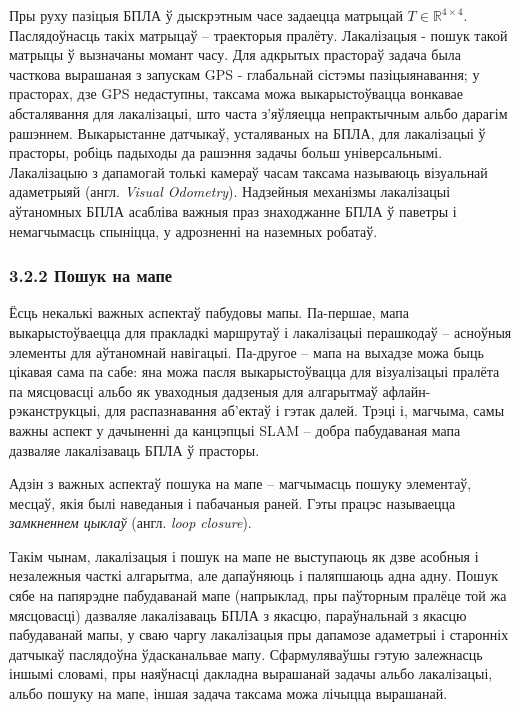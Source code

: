 Пры руху пазіцыя БПЛА ў дыскрэтным часе задаецца матрыцай $T \in \mathbb{R}^{4\times4}$.
Паслядоўнасць такіх матрыцаў -- траекторыя пралёту. Лакалізацыя - пошук такой матрыцы ў вызначаны момант часу.
Для адкрытых прастораў задача была часткова вырашаная з запускам GPS - глабальнай сістэмы
пазіцыянавання; у прасторах, дзе GPS недаступны, таксама можа выкарыстоўвацца вонкавае
абсталявання для лакалізацыі, што часта з'яўляецца непрактычным альбо дарагім рашэннем.
Выкарыстанне датчыкаў, усталяваных на БПЛА, для лакалізацыі ў прасторы, робіць падыходы
да рашэння задачы больш універсальнымі. Лакалізацыю з дапамогай толькі камераў часам
таксама называюць візуальнай адаметрыяй (англ. \textit{Visual Odometry}). Надзейныя механізмы
лакалізацыі аўтаномных БПЛА асабліва важныя праз знаходжанне БПЛА ў паветры і
немагчымасць спыніцца, у адрозненні на наземных робатаў.

\renewcommand{\nextTitle}{3.2.2 Пошук на мапе}
\addcontentsline{toc}{subsubsection}{\nextTitle}
\subsubsection*{\nextTitle}

Ёсць некалькі важных аспектаў пабудовы мапы. Па-першае, мапа выкарыстоўваецца для пракладкі
маршрутаў і лакалізацыі перашкодаў -- асноўныя элементы для аўтаномнай навігацыі. Па-другое --
мапа на выхадзе можа быць цікавая сама па сабе: яна можа пасля выкарыстоўвацца для візуалізацыі пралёта
па мясцовасці альбо як уваходныя дадзеныя для алгарытмаў афлайн-рэканструкцыі, для распазнавання
аб'ектаў і гэтак далей. Трэці і, магчыма, самы важны аспект у дачыненні да канцэпцыі SLAM --
добра пабудаваная мапа дазваляе лакалізаваць БПЛА ў прасторы.

Адзін з важных аспектаў пошука на мапе -- магчымасць пошуку элементаў, месцаў,
якія былі наведаныя і пабачаныя раней.
Гэты працэс называецца \textit{замкненнем цыклаў} (англ. \textit{loop closure}).

\vspace{5mm}

Такім чынам, лакалізацыя і пошук на мапе не выступаюць як дзве асобныя і незалежныя
часткі алгарытма, але дапаўняюць і паляпшаюць адна адну. Пошук сябе на папярэдне пабудаванай мапе
(напрыклад, пры паўторным пралёце той жа мясцовасці) дазваляе лакалізаваць БПЛА з
якасцю, параўнальнай з якасцю пабудаванай мапы, у сваю чаргу лакалізацыя пры дапамозе
адаметрыі і старонніх датчыкаў паслядоўна ўдасканальвае мапу. Сфармуляваўшы гэтую залежнасць
іншымі словамі, пры наяўнасці дакладна вырашанай задачы альбо лакалізацыі, альбо пошуку на мапе,
іншая задача таксама можа лічыцца вырашанай.


